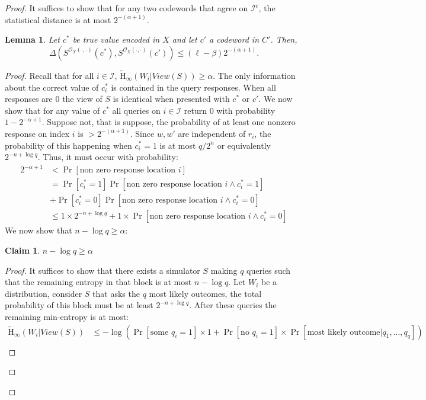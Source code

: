 \documentclass[11pt]{article}
\newcommand{\Hav}{\tilde{\mathrm{H}}_\infty}
\newtheorem{lemma}[theorem]{Lemma}
\newtheorem{claim}[theorem]{Claim}
\begin{document}
\begin{proof}
\noindent It suffices to show that for any two codewords that agree on $\mathcal{I}^c$, the statistical distance is at most $2^{-(\alpha+1)}$.
\begin{lemma}
\label{lem:codewords in I close}
Let $c^*$ be true value encoded in $X$ and let $c'$ a codeword in $C'$.  Then, 
\[
\Delta( S^{\mathcal{O}_X(\cdot, \cdot)}(c^*), S^{\mathcal{O}_X(\cdot, \cdot)}(c')) \le ( \ell -\beta) 2^{-(\alpha+1)}.
\]
\end{lemma}
\begin{proof}
Recall that for all $i\in \mathcal{I}$, $\Hav(W_i | View(S))\geq \alpha$.  The only information about the correct value of $c_i^*$ is contained in the query responses.  When all responses are $0$ the view of $S$ is identical when presented with $c^*$ or $c'$.  We now show that for any value of $c^*$ all queries on $i \in \mathcal{I}$ return $0$ with probability $1-2^{-\alpha+1}$.  Suppose not, that is suppose, the probability of at least one nonzero response on index $i$ is $> 2^{-(\alpha+1)}$.  Since $w, w'$ are independent of $r_i$, the probability of this happening when $c^*_i = 1$ is at most $q/2^n$ or equivalently $2^{-n+\log q}$.  Thus, it must occur with probability:
\begin{align}
2^{-\alpha+1}&<\Pr[\text{non zero response location }i]\nonumber \\
 &= \Pr[c_i^* =1]\Pr[\text{non zero response location }i\wedge c_i^*=1]\nonumber \\&+ \Pr[c_i^*=0] \Pr[\text{non zero response location }i \wedge c_i^*=0]\nonumber \\
&\le 1\times 2^{-n+\log q} + 1\times  \Pr[\text{non zero response location }i \wedge c_i^*=0] \label{eq:ways to remove ent}
\end{align}
We now show that $n-\log q \geq \alpha$:
\begin{claim}
\label{cl:ent bounded away from n}
$n-\log q \geq \alpha$
\end{claim}
\begin{proof}
It suffices to show that there exists a simulator $S$ making $q$ queries such that the remaining entropy in that block is at most $n-\log q$.  Let $W_i$ be a distribution, consider $S$ that asks the $q$ most likely outcomes, the total probability of this block must be at least $2^{-n+\log q}$.  After these queries the remaining min-entropy is at most:
\begin{align*}
\Hav(W_i | View(S)) &\leq  -\log \left(\Pr[\text{some }q_i=1]\times 1+ \Pr[\text{no }q_i=1]\times \Pr[\text{most likely outcome}|q_1,...,q_q]\right)\\

\end{align*}
\end{proof}
\end{proof}
\end{proof}
\end{document}
